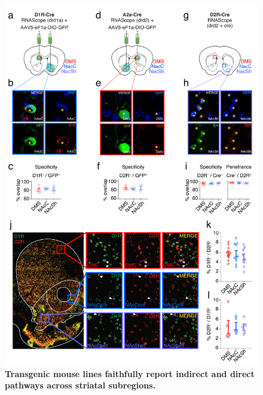 \begin{figure}[t!]
  \begin{center}
    \includegraphics[width=0.85\linewidth]{ch7-appendix1/appendix1-figures/Supplementary_Fig1.pdf}
    \caption[Transgenic mouse lines faithfully report indirect and direct pathways across striatal subregions]{\textbf{Transgenic mouse lines faithfully report indirect and direct pathways across striatal subregions.}}
    \label{fig:ap1:supp1}
  \end{center}
  \vspace{-1.5cm}
\end{figure}
